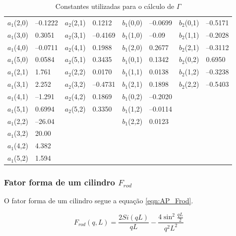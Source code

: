 \begin{apendicesenv}
\begin{table}[h]
    \IBGEtab%
    {\caption{Constantes utilizadas para o cálculo de \(\Gamma\)}
    \label{tab_ap:AiBi}}%
    {\begin{tabular}{r l | r l | r l | r l}
    	\toprule
    	\(a_1\)(2,0) & --0.1222 & \(a_2\)(2,1) & 0.1212   & \(b_1\)(0,0) & --0.0699 & \(b_2\)(0,1) & --0.5171 \\
    	\(a_1\)(3,0) & 0.3051   & \(a_2\)(3,1) & --0.4169 & \(b_1\)(1,0) & --0.09   & \(b_2\)(1,1) & --0.2028 \\
    	\(a_1\)(4,0) & --0.0711 & \(a_2\)(4,1) & 0.1988   & \(b_1\)(2,0) & 0.2677   & \(b_2\)(2,1) & --0.3112 \\
    	\(a_1\)(5,0) & 0.0584   & \(a_2\)(5,1) & 0.3435   & \(b_1\)(0,1) & 0.1342   & \(b_2\)(0,2) & 0.6950   \\
    	\(a_1\)(2,1) & 1.761    & \(a_2\)(2,2) & 0.0170   & \(b_1\)(1,1) & 0.0138   & \(b_2\)(1,2) & --0.3238 \\
    	\(a_1\)(3,1) & 2.252    & \(a_2\)(3,2) & --0.4731 & \(b_1\)(2,1) & 0.1898   & \(b_2\)(2,2) & --0.5403 \\
    	\(a_1\)(4,1) & --1.291  & \(a_2\)(4,2) & 0.1869   & \(b_1\)(0,2) & --0.2020 &            &          \\
    	\(a_1\)(5,1) & 0.6994   & \(a_2\)(5,2) & 0.3350   & \(b_1\)(1,2) & --0.0114 &            &          \\
    	\(a_1\)(2,2) & --26.04  &            &          & \(b_1\)(2,2) & 0.0123   &            &          \\
    	\(a_1\)(3,2) & 20.00    &            &          &            &          &            &          \\
    	\(a_1\)(4,2) & 4.382    &            &          &            &          &            &          \\
    	\(a_1\)(5,2) & 1.594    &            &          &            &          &            &          \\ \bottomrule
    \end{tabular} }%
    {}%
\end{table}

\subsubsection{Fator forma de um cilindro \(F_{rod}\)}

O fator forma de um cilindro segue a equação \ref{eqn:AP_Frod}.

\begin{equation}
F_{rod}(q, L) = \frac{2Si(qL)}{qL} - \frac{4\sin^2\frac{qL}{2}}{q^2L^2}
\label{eqn:AP_Frod}
\end{equation}


\end{apendicesenv}
